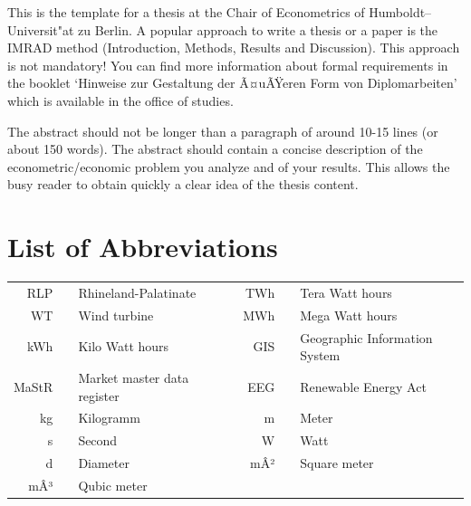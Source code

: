 \documentclass[a4paper,11pt]{article}
\begin{document}
This is the template for a thesis at the Chair of Econometrics of
Humboldt--Universit"at zu Berlin. A popular approach to write a thesis or a
paper is the IMRAD method (Introduction, Methods, Results and Discussion). This
approach is not mandatory! You can find more information about formal
requirements in the booklet `Hinweise zur Gestaltung der Ã¤uÃŸeren Form von
Diplomarbeiten' which is available in the office of studies.

The abstract should not be longer than a paragraph of around 10-15 lines (or
about 150 words). The abstract should contain a concise description of the
econometric/economic problem you analyze and of your results. This allows the
busy reader to obtain quickly a clear idea of the thesis content.

\newpage
\hypertarget{list-of-abbreviations}{%
\section*{List of Abbreviations}\label{list-of-abbreviations}}
\begin{tabular}{rp{0.2cm}lp{1cm}rp{0.2cm}l}
    RLP     & &  Rhineland-Palatinate         & & TWh     & &  Tera Watt hours  \\
    WT      & &  Wind turbine                 & & MWh     & &  Mega Watt hours \\
    kWh     & &  Kilo Watt hours              & & GIS     & &  Geographic Information System \\
    MaStR   & &  Market master data register  & & EEG     & &  Renewable Energy Act \\
    kg      & &  Kilogramm                    & & m       & &  Meter \\
    s       & &  Second                       & & W       & &  Watt \\
    d       & &  Diameter                     & & mÂ²      & &  Square meter \\
    mÂ³      & &  Qubic meter                  & &    
\end{tabular}
\newpage
\listoffigures
{}
\end{document}
